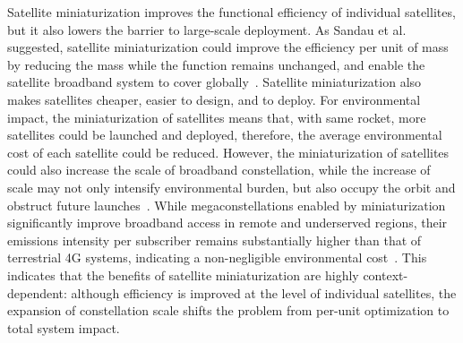 \documentclass[12pt]{article}
\begin{document}
Satellite miniaturization improves the functional efficiency of individual satellites, but it also lowers the barrier to large-scale deployment. As Sandau et al. suggested, satellite miniaturization could improve the efficiency per unit of mass by reducing the mass while the function remains unchanged, and enable the satellite broadband system to cover globally~\citep{sandau2010smallsat}. Satellite miniaturization also makes satellites cheaper, easier to design, and to deploy. For environmental impact, the miniaturization of satellites means that, with same rocket, more satellites could be launched and deployed, therefore, the average environmental cost of each satellite could be reduced. However, the miniaturization of satellites could also increase the scale of broadband constellation, while the increase of scale may not only intensify environmental burden, but also occupy the orbit and obstruct future launches~\citep{kumaran2024manufacturing}. While megaconstellations enabled by miniaturization significantly improve broadband access in remote and underserved regions, their emissions intensity per subscriber remains substantially higher than that of terrestrial 4G systems, indicating a non-negligible environmental cost~\citep{osoro2025leo,kukreja2025leo}. This indicates that the benefits of satellite miniaturization are highly context-dependent: although efficiency is improved at the level of individual satellites, the expansion of constellation scale shifts the problem from per-unit optimization to total system impact.
\end{document}
